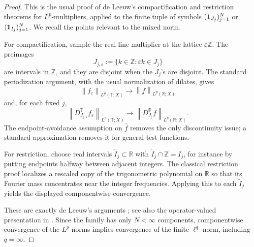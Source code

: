 \documentclass[11pt]{article}
\newcommand{\T}{\mathbb T}
\newcommand{\R}{\mathbb R}
\newcommand{\Z}{\mathbb Z}
\newcommand{\norm}[1]{\left\lVert #1 \right\rVert}
\begin{document}
\begin{proof}
This is the usual proof of de Leeuw's compactification and restriction
theorems for \(L^p\)-multipliers, applied to the finite tuple of symbols
\(({\bf 1}_{J_j})_{j=1}^N\) or \(({\bf 1}_{I_j})_{j=1}^N\).  We recall the
points relevant to the mixed norm.

For compactification, sample the real-line multiplier at the lattice
\(\varepsilon\Z\).  The preimages
\[
  J_{j,\varepsilon}:=\{k\in\Z:\varepsilon k\in J_j\}
\]
are intervals in \(\Z\), and they are disjoint when the \(J_j\)'s are
disjoint.  The standard periodization argument, with the usual normalization
of dilates, gives
\[
  \norm{f_\varepsilon}_{L^p(\T;X)}
  \to \norm{f}_{L^p(\R;X)}
\]
and, for each fixed \(j\),
\[
  \norm{D_{J_{j,\varepsilon}}^\T f_\varepsilon}_{L^p(\T;X)}
  \to
  \norm{D_{J_j}^\R f}_{L^p(\R;X)}.
\]
The endpoint-avoidance assumption on \(\widehat f\) removes the only
discontinuity issue; a standard approximation removes it for general test
functions.

For restriction, choose real intervals \(\widetilde I_j\subset\R\) with
\(\widetilde I_j\cap\Z=I_j\), for instance by putting endpoints halfway
between adjacent integers.  The classical restriction proof localizes a
rescaled copy of the trigonometric polynomial on \(\R\) so that its Fourier
mass concentrates near the integer frequencies.  Applying this to each
\(\widetilde I_j\) yields the displayed componentwise convergence.

These are exactly de Leeuw's arguments \cite{deLeeuw}; see also the
operator-valued presentation in \cite[Chapter 5]{HNVW1}.  Since the family has
only \(N<\infty\) components, componentwise convergence of the \(L^p\)-norms
implies convergence of the finite \(\ell^q\)-norm, including \(q=\infty\).
\end{proof}
\end{document}
